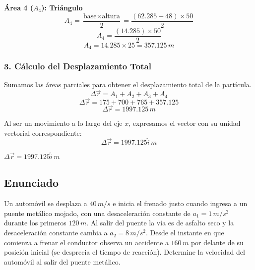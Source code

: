 \documentclass[12pt, a4paper]{article}
\begin{document}
\textbf{Área 4 ($A_4$): Triángulo}
$$ A_4 = \frac{\text{base} \times \text{altura}}{2} = \frac{(62.285 - 48) \times 50}{2} $$
$$ A_4 = \frac{(14.285) \times 50}{2} $$
$$ A_4 = 14.285 \times 25 = 357.125 \, \si{m} $$

\subsubsection*{3. Cálculo del Desplazamiento Total}
Sumamos las áreas parciales para obtener el desplazamiento total de la partícula.
$$ \Delta\vec{r} = A_1 + A_2 + A_3 + A_4 $$
$$ \Delta\vec{r} = 175 + 700 + 765 + 357.125 $$
$$ \Delta\vec{r} = 1997.125 \, \si{m} $$

Al ser un movimiento a lo largo del eje $x$, expresamos el vector con su unidad vectorial correspondiente:
$$ \Delta\vec{r} = 1997.125\hat{i} \, \si{m} $$

\begin{tcolorbox}[colback=green!5!white, colframe=green!50!black, title=Respuesta Final]
\centering \Large $\Delta\vec{r} = 1997.125\hat{i} \, \si{m}$
\end{tcolorbox}

\newpage

\subsection*{Enunciado}
Un automóvil se desplaza a $40 \, \si{m/s}$ e inicia el frenado justo cuando ingresa a un puente metálico mojado, con una desaceleración constante de $a_1 = 1 \, \si{m/s^2}$ durante los primeros $120 \, \si{m}$. Al salir del puente la vía es de asfalto seco y la desaceleración constante cambia a $a_2 = 8 \, \si{m/s^2}$. Desde el instante en que comienza a frenar el conductor observa un accidente a $160 \, \si{m}$ por delante de su posición inicial (se desprecia el tiempo de reacción). Determine la velocidad del automóvil al salir del puente metálico.
\end{document}
